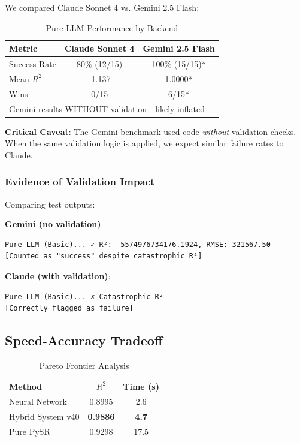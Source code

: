 \documentclass[11pt,a4paper]{article}
\begin{document}
We compared Claude Sonnet 4 vs. Gemini 2.5 Flash:

\begin{table}[h]
\centering
\caption{Pure LLM Performance by Backend}
\begin{tabular}{lcc}
\toprule
\textbf{Metric} & \textbf{Claude Sonnet 4} & \textbf{Gemini 2.5 Flash} \\
\midrule
Success Rate & 80\% (12/15) & 100\% (15/15)* \\
Mean $R^2$ & -1.137 & 1.0000* \\
Wins & 0/15 & 6/15* \\
\bottomrule
\multicolumn{3}{l}{\footnotesize *Gemini results WITHOUT validation—likely inflated}
\end{tabular}
\end{table}

\textbf{Critical Caveat}: The Gemini benchmark used code \textit{without} validation checks. When the same validation logic is applied, we expect similar failure rates to Claude.

\subsubsection{Evidence of Validation Impact}

Comparing test outputs:

\textbf{Gemini (no validation)}:
\begin{verbatim}
Pure LLM (Basic)... ✓ R²: -5574976734176.1924, RMSE: 321567.50
[Counted as "success" despite catastrophic R²]
\end{verbatim}

\textbf{Claude (with validation)}:
\begin{verbatim}
Pure LLM (Basic)... ✗ Catastrophic R²
[Correctly flagged as failure]
\end{verbatim}

\subsection{Speed-Accuracy Tradeoff}

\begin{table}[h]
\centering
\caption{Pareto Frontier Analysis}
\begin{tabular}{lcc}
\toprule
\textbf{Method} & \textbf{$R^2$} & \textbf{Time (s)} \\
\midrule
Neural Network & 0.8995 & 2.6 \\
Hybrid System v40 & \textbf{0.9886} & \textbf{4.7} \\
Pure PySR & 0.9298 & 17.5 \\
\bottomrule
\end{tabular}
\end{table}
\end{document}
